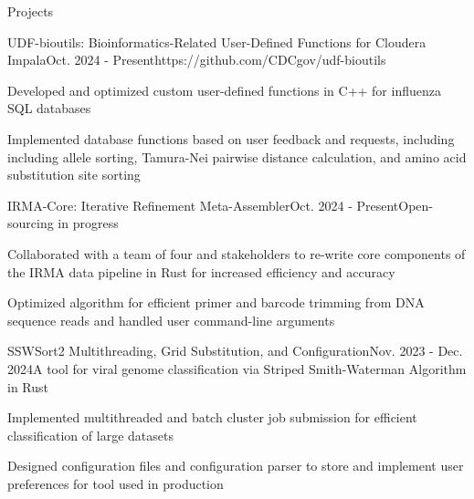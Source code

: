 \documentclass{resume} %
\begin{document}
\begin{rSection}{Projects}
\itemsep -2pt


  \begin{rSubsection}{UDF-bioutils: Bioinformatics-Related User-Defined Functions for Cloudera Impala}{Oct. 2024 - Present}{https://github.com/CDCgov/udf-bioutils}{}
  \item Developed and optimized custom user-defined functions in C++ for influenza SQL databases
  \item Implemented database functions based on user feedback and requests, including including allele sorting, Tamura-Nei pairwise distance calculation, and amino acid substitution site sorting
  \end{rSubsection}

  \begin{rSubsection}{IRMA-Core: Iterative Refinement Meta-Assembler}{Oct. 2024 - Present}{Open-sourcing in progress}{}
  \item Collaborated with a team of four and stakeholders to re-write core components of the IRMA data pipeline in Rust for increased efficiency and accuracy
  \item Optimized algorithm for efficient primer and barcode trimming from DNA sequence reads and handled user command-line arguments
  \end{rSubsection}

  \pagebreak

  \begin{rSubsection}{SSWSort2 Multithreading, Grid Substitution, and Configuration}{Nov. 2023 - Dec. 2024}{A tool for viral genome classification via Striped Smith-Waterman Algorithm in Rust}{}
  \item Implemented multithreaded and batch cluster job submission for efficient classification of large datasets
  \item Designed configuration files and configuration parser to store and implement user preferences for tool used in production


\end{rSubsection}
\end{rSection}
\end{document}
